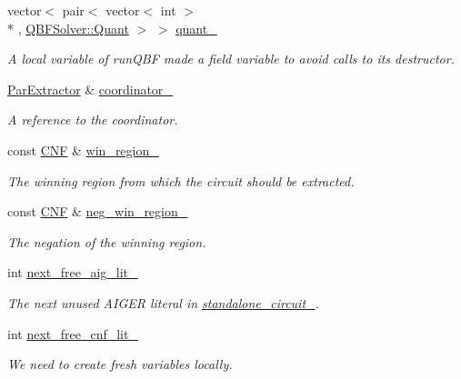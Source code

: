 \begin{DoxyCompactItemize}
vector$<$ pair$<$ vector$<$ int $>$\\*
, \hyperlink{classQBFSolver_ac091e263cb55286cc07b2451bcf4d3c7}{Q\-B\-F\-Solver\-::\-Quant} $>$ $>$ \hyperlink{classParExtractorQBFWorker_a6134568b687c7b2dcbd27e32eb91c431}{quant\-\_\-}
\begin{DoxyCompactList}\small\item\em A local variable of run\-Q\-B\-F made a field variable to avoid calls to its destructor. \end{DoxyCompactList}\item 
\hyperlink{classParExtractor}{Par\-Extractor} \& \hyperlink{classParExtractorWorker_a749b01fd5ad1a57ae5793db2bb3b4e47}{coordinator\-\_\-}
\begin{DoxyCompactList}\small\item\em A reference to the coordinator. \end{DoxyCompactList}\item 
const \hyperlink{classCNF}{C\-N\-F} \& \hyperlink{classParExtractorWorker_abccf0d629d4dca3a94cc572130e6d0e9}{win\-\_\-region\-\_\-}
\begin{DoxyCompactList}\small\item\em The winning region from which the circuit should be extracted. \end{DoxyCompactList}\item 
const \hyperlink{classCNF}{C\-N\-F} \& \hyperlink{classParExtractorWorker_a423caaf7f20528eb06b176acc09ae8ee}{neg\-\_\-win\-\_\-region\-\_\-}
\begin{DoxyCompactList}\small\item\em The negation of the winning region. \end{DoxyCompactList}\item 
int \hyperlink{classParExtractorWorker_a07219034862a2f4dabe22ecdc0d04ae0}{next\-\_\-free\-\_\-aig\-\_\-lit\-\_\-}
\begin{DoxyCompactList}\small\item\em The next unused A\-I\-G\-E\-R literal in \hyperlink{classParExtractorWorker_a233a7f99946695b0640e76ead6932fbb}{standalone\-\_\-circuit\-\_\-}. \end{DoxyCompactList}\item 
int \hyperlink{classParExtractorWorker_a71f5c8e875908f12f60964ec17e2b203}{next\-\_\-free\-\_\-cnf\-\_\-lit\-\_\-}
\begin{DoxyCompactList}\small\item\em We need to create fresh variables locally. \end{DoxyCompactList}\item 

\end{DoxyCompactItemize}
